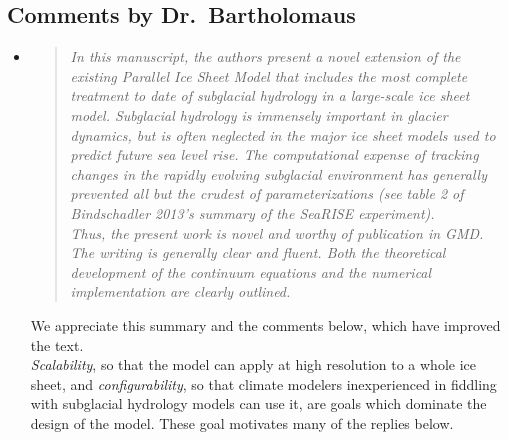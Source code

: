 \documentclass[11pt,reqno]{amsart}
\newcommand{\reply}[2]{
\medskip\medskip
\item  \begin{quote}
\emph{#1}
\end{quote}

\medskip
\noindent #2}
\begin{document}
\subsection*{Comments by Dr.~Bartholomaus}\begin{itemize}

\reply{In this manuscript, the authors present a novel extension of the existing Parallel Ice Sheet Model that includes the most complete treatment to date of subglacial hydrology in a large-scale ice sheet model.  Subglacial hydrology is immensely important in glacier dynamics, but is often neglected in the major ice sheet models used to predict future sea level rise.  The computational expense of tracking changes in the rapidly evolving subglacial environment has generally prevented all but the crudest of parameterizations (see table 2 of Bindschadler 2013's summary of the SeaRISE experiment).\\
Thus, the present work is novel and worthy of publication in GMD.  The writing is generally clear and fluent.  Both the theoretical development of the continuum equations and the numerical implementation are clearly outlined.}
{We appreciate this summary and the comments below, which have improved the text.\\
\indent \emph{Scalability}, so that the model can apply at high resolution to a whole ice sheet, and \emph{configurability}, so that climate modelers inexperienced in fiddling with subglacial hydrology models can use it, are goals which dominate the design of the model.  These goal motivates many of the replies below.}


\end{itemize}
\end{document}
